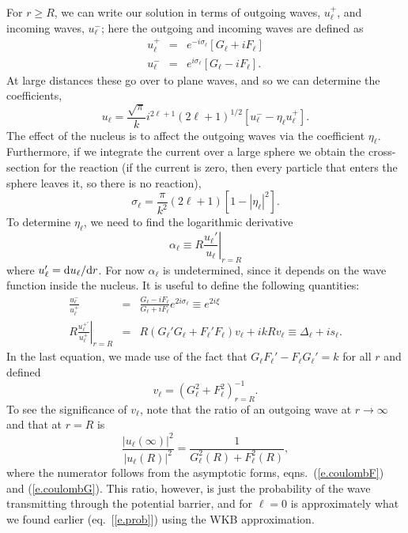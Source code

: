For $r \geq R$, we can write our solution in terms of outgoing waves, $u_{\ell}^{+}$, and incoming waves, $u_{\ell}^{-}$; here the outgoing and incoming waves are defined as 
\begin{eqnarray*}
u_{\ell}^{+} &=& e^{-i\sigma_{\ell}}\left[G_{\ell} + i F_{\ell}\right]\\
u_{\ell}^{-} &=& e^{i\sigma_{\ell}}\left[G_{\ell} - i F_{\ell}\right].
\end{eqnarray*}
At large distances these go over to plane waves,  and so we can determine the coefficients,
\begin{equation}\label{e.coulomb-solution}
u_{\ell} = \frac{\sqrt{\pi}}{k}i^{2\ell + 1}(2\ell +1)^{1/2}\left[u_{\ell}^{-} - \eta_{\ell}u_{\ell}^{+}\right].
\end{equation}
The effect of the nucleus is to affect the outgoing waves via the coefficient $\eta_{\ell}$.  Furthermore, if we integrate the current over a large sphere we obtain the cross-section for the reaction (if the current is zero, then every particle that enters the sphere leaves it, so there is no reaction),
\begin{equation}\label{e.cross-section-eta}
\sigma_{\ell} = \frac{\pi}{k^{2}}(2\ell +1) \left[ 1 - |\eta_{\ell}|^{2}\right].
\end{equation}
To determine $\eta_{\ell}$, we need to find the logarithmic derivative
\[
\alpha_{\ell} \equiv R\left.\frac{u_{\ell}'}{u_{\ell}}\right|_{r=R}
\]
where $u_{\ell}' = \mathrm{d} u_{\ell}/\mathrm{d} r$.  For now $\alpha_{\ell}$ is undetermined, since it depends on the wave function inside the nucleus.  It is useful to define the following quantities:
\begin{eqnarray}\label{e.coulombPhase}
\frac{u_{\ell}^{-}}{u_{\ell}^{+}} & = & \frac{G_{\ell} - i F_{\ell}}{G_{\ell} + i F_{\ell}}e^{2i\sigma_{\ell}} \equiv e^{2i\xi}\\
R\left.\frac{u_{\ell}^{+'}}{u_{\ell}^{+}}\right|_{r=R} &=& R(G_{\ell}'G_{\ell} + F_{\ell}'F_{\ell})v_{\ell} + i kR v_{\ell} \equiv \Delta_{\ell} + is_{\ell}.
\label{e.delta-s}
\end{eqnarray}
In the last equation, we made use of the fact that $G_{\ell}F_{\ell}' - F_{\ell}G_{\ell}' = k$ for all $r$ and defined
\[
v_{\ell} = \left(G_{\ell}^{2} + F_{\ell}^{2}\right)^{-1}_{r=R}.
\]
To see the significance of $v_{\ell}$, note that the ratio of an outgoing wave at $r\to\infty$ and that at $r=R$ is
\[
\frac{|u_{\ell}(\infty)|^{2}}{|u_{\ell}(R)|^{2}} = \frac{1}{G_{\ell}^{2}(R) + F_{\ell}^{2}(R)},
\]
where the numerator follows from the asymptotic forms, eqns.~(\ref{e.coulombF}) and (\ref{e.coulombG}). This ratio, however, is just the probability of the wave transmitting through the potential barrier, and for $\ell=0$ is approximately what we found earlier (eq.~[\ref{e.prob}]) using the WKB approximation.

